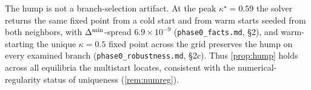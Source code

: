 \begin{remark}
\label{rem:across-eqm}
The hump is not a branch-selection artifact. At the peak $\kappa^\star=0.59$ the
solver returns the same fixed point from a cold start and from warm starts seeded
from both neighbors, with $\Delta^{\min}$-spread $6.9\times10^{-9}$
(\texttt{phase0\_facts.md}, \S2), and warm-starting the unique $\kappa=0.5$ fixed
point across the grid preserves the hump on every examined branch
(\texttt{phase0\_robustness.md}, \S2c). Thus \ref{prop:hump} holds across all
equilibria the multistart locates, consistent with the numerical-regularity
status of uniqueness (\ref{rem:numreg}).
\end{remark}
